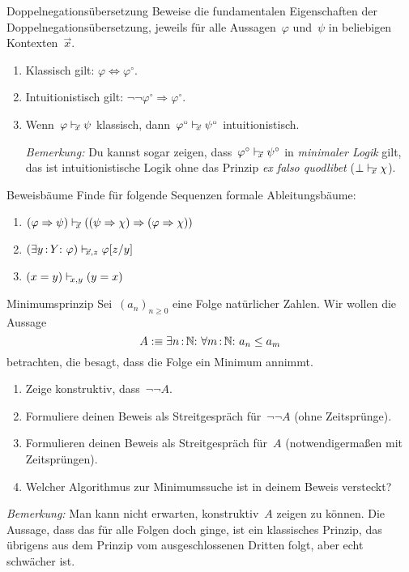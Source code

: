 \documentclass{pizzablatt}
\begin{document}

\begin{aufgabe}{Doppelnegationsübersetzung}
Beweise die fundamentalen Eigenschaften der Doppelnegationsübersetzung, jeweils für alle
Aussagen~$\varphi$ und~$\psi$ in beliebigen Kontexten~$\vec x$.
\begin{enumerate}
\item Klassisch gilt: $\varphi \Longleftrightarrow \varphi^\circ$.
\item Intuitionistisch gilt: $\neg\neg\varphi^\circ \Longrightarrow
\varphi^\circ$.
\item Wenn~$\varphi \mathrel{\vdash\!\!\!_{\vec x}} \psi$ klassisch, dann~$\varphi^\circ \mathrel{\vdash\!\!\!_{\vec
x}} \psi^\circ$ intuitionistisch.

\emph{Bemerkung:} Du kannst sogar zeigen, dass~$\varphi^\circ \mathrel{\vdash\!\!\!_{\vec x}}
\psi^\circ$ in \emph{minimaler Logik} gilt, das ist intuitionistische Logik
ohne das Prinzip \emph{ex falso quodlibet} ($\bot \mathrel{\vdash\!\!\!_{\vec x}} \chi$).
\end{enumerate}
\end{aufgabe}

\begin{aufgabe}{Beweisbäume}
Finde für folgende Sequenzen formale Ableitungsbäume:
\begin{enumerate}
\item $(\varphi \Rightarrow \psi) \mathrel{\vdash\!\!\!_{\vec x}} ((\psi \Rightarrow \chi)
\Rightarrow (\varphi \Rightarrow \chi))$
\item $(\exists y\,{:}\,Y{:}\ \varphi) \mathrel{\vdash\!\!\!_{\vec x,z}} \varphi[z/y]$
\item $(x = y) \mathrel{\vdash\!\!\!_{x,y}} (y = x)$
\end{enumerate}
\end{aufgabe}

\begin{aufgabe}{Minimumsprinzip}
Sei~$(a_n)_{n \geq 0}$ eine Folge natürlicher Zahlen. Wir wollen die Aussage
\[ A :\equiv \exists n\?\NN{:}\ \forall m\?\NN{:}\ a_n \leq a_m \]
betrachten, die besagt, dass die Folge ein Minimum annimmt.

\begin{enumerate}
\item Zeige konstruktiv, dass~$\neg\neg A$.
\item Formuliere deinen Beweis als Streitgespräch für~$\neg\neg A$ (ohne
Zeitsprünge).
\item Formulieren deinen Beweis als Streitgespräch für~$A$ (notwendigermaßen
mit Zeitsprüngen).
\item Welcher Algorithmus zur Minimumssuche ist in deinem Beweis versteckt?
\end{enumerate}

\emph{Bemerkung:} Man kann nicht erwarten,
konstruktiv~$A$ zeigen zu können. Die Aussage, dass das für alle Folgen doch
ginge, ist ein klassisches Prinzip, das übrigens aus dem Prinzip vom
ausgeschlossenen Dritten folgt, aber echt schwächer ist.
\end{aufgabe}
\end{document}
